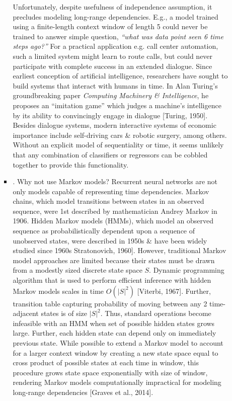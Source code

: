\documentclass{article}
\begin{document}
\begin{enumerate}
\begin{itemize}
\begin{itemize}
			Unfortunately, despite usefulness of independence assumption, it precludes modeling long-range dependencies. E.g., a model trained using a finite-length context window of length 5 could never be trained to answer simple question, {\it``what was data point seen 6 time steps ago?''} For a practical application e.g. call center automation, such a limited system might learn to route calls, but could never participate with complete success in an extended dialogue. Since earliest conception of artificial intelligence, researchers have sought to build systems that interact with humans in time. In {\sc Alan Turing}'s groundbreaking paper {\it Computing Machinery \& Intelligence}, he proposes an ``imitation game'' which judges a machine's intelligence by its ability to convincingly engage in dialogue [Turing, 1950]. Besides dialogue systems, modern interactive systems of economic importance include self-driving cars \& robotic surgery, among others. Without an explicit model of sequentiality or time, it seems unlikely that any combination of classifiers or regressors can be cobbled together to provide this functionality.
			\item {. Why not use Markov models?} Recurrent neural networks are not only models capable of representing time dependencies. Markov chains, which model transitions between states in an observed sequence, were 1st described by mathematician {\sc Andrey Markov} in 1906. Hidden Markov models (HMMs), which model an observed sequence as probabilistically dependent upon a sequence of unobserved states, were described in 1950s \& have been widely studied since 1960s Stratonovich, 1960]. However, traditional Markov model approaches are limited because their states must be drawn from a modestly sized discrete state space $S$. Dynamic programming algorithm that is used to perform efficient inference with hidden Markov models scales in time $O(|S|^2)$ [Viterbi, 1967]. Further, transition table capturing probability of moving between any 2 time-adjacent states is of size $|S|^2$. Thus, standard operations become infeasible with an HMM when set of possible hidden states grows large. Further, each hidden state can depend only on immediately previous state. While possible to extend a Markov model to account for a larger context window by creating a new state space equal to cross product of possible states at each time in window, this procedure grows state space exponentially with size of window, rendering Markov models computationally impractical for modeling long-range dependencies [Graves et al., 2014].
			

\end{itemize}
\end{itemize}
\end{enumerate}
\end{document}
